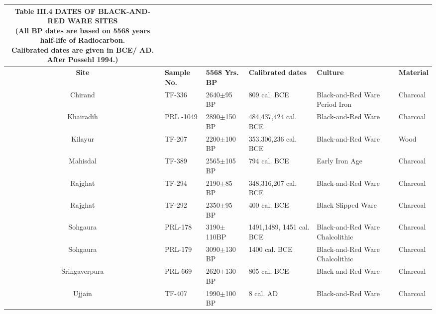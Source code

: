 {\setlength\tabcolsep{2pt}
{\fontsize{7}{9}\selectfont
\begin{longtable}{|c|p{1cm}|p{1.5cm}|p{1.5cm}|p{1.5cm}|p{1cm}|}
\caption*{Table III.4 DATES OF BLACK-AND-RED WARE SITES\\[10pt]
(All BP dates are based on 5568 years half-life of Radiocarbon. \\
Calibrated dates are given in BCE/ AD. After Possehl 1994.)}\label{table III.4}\\
\hline
\multicolumn{1}{|m{1cm}|}{\centering \textbf{Site}} &\multicolumn{1}{m{1cm}|}{\centering \textbf{Sample No.}}&\multicolumn{1}{m{1.5cm}|}{\centering \textbf{5568 Yrs. BP}} &\multicolumn{1}{m{1.5cm}|}{\centering \textbf{Calibrated dates}} & \multicolumn{1}{m{1.5cm}|}{\centering \textbf{Culture}} & \multicolumn{1}{m{.75cm}|}{\centering \textbf{Material}}\\
\endfirsthead
\hline
\endhead
\hline
\endfoot
\hline
Chirand & TF-336 & 2640$\pm$95 BP & 809 cal. BCE & Black-and-Red Ware Period Iron & Charcoal\\
Khairadih & PRL -1049 & 2890$\pm$150 BP & 484,437,424 cal. BCE & Black-and-Red Ware & Charcoal\\
Kilayur & TF-207 & 2200$\pm$100 BP & 353,306,236 cal. BCE & Black-and-Red Ware & Wood\\
Mahisdal & TF-389 & 2565$\pm$105 BP & 794 cal. BCE & Early Iron Age & Charcoal\\
Rajghat & TF-294 & 2190$\pm$85 BP & 348,316,207 cal. BCE & Black-and-Red Ware & Charcoal\\
Rajghat & TF-292 & 2350$\pm$95 BP & 400 cal. BCE & Black Slipped Ware & Charcoal\\
Sohgaura & PRL-178 & 3190$\pm$110BP & 1491,1489, 1451 cal. BCE & Black-and-Red Ware Chalcolithic & Charcoal\\
Sohgaura & PRL-179 & 3090$\pm$130 BP & 1400 cal. BCE & Black-and-Red Ware Chalcolithic & Charcoal\\
Sringaverpura & PRL-669 & 2620$\pm$130 BP & 805 cal. BCE & Black-and-Red Ware & Charcoal\\
Ujjain  & TF-407 & 1990$\pm$100 BP & 8 cal. AD & Black-and-Red Ware & Charcoal
\end{longtable}
}}

